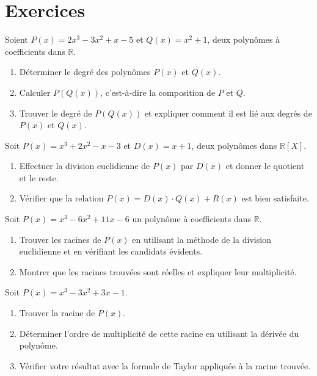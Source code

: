 \section{Exercices}
\begin{exercice}
Soient \( P(x) = 2x^3 - 3x^2 + x - 5 \) et \( Q(x) = x^2 + 1 \), deux polynômes à coefficients dans \( \mathbb{R} \).
\begin{enumerate}
    \item Déterminer le degré des polynômes \( P(x) \) et \( Q(x) \).
    \item Calculer \( P(Q(x)) \), c'est-à-dire la composition de \( P \) et \( Q \).
    \item Trouver le degré de \( P(Q(x)) \) et expliquer comment il est lié aux degrés de \( P(x) \) et \( Q(x) \).
\end{enumerate}
\end{exercice}

\begin{exercice}
Soit \( P(x) = x^3 + 2x^2 - x - 3 \) et \( D(x) = x + 1 \), deux polynômes dans \( \mathbb{R}[X] \).
\begin{enumerate}
    \item Effectuer la division euclidienne de \( P(x) \) par \( D(x) \) et donner le quotient et le reste.
    \item Vérifier que la relation \( P(x) = D(x) \cdot Q(x) + R(x) \) est bien satisfaite.
\end{enumerate}
\end{exercice}

\begin{exercice}
Soit \( P(x) = x^3 - 6x^2 + 11x - 6 \) un polynôme à coefficients dans \( \mathbb{R} \).
\begin{enumerate}
    \item Trouver les racines de \( P(x) \) en utilisant la méthode de la division euclidienne et en vérifiant les candidats évidents.
    \item Montrer que les racines trouvées sont réelles et expliquer leur multiplicité.
\end{enumerate}
\end{exercice}

\begin{exercice}
Soit \( P(x) = x^3 - 3x^2 + 3x - 1 \).
\begin{enumerate}
    \item Trouver la racine de \( P(x) \).
    \item Déterminer l’ordre de multiplicité de cette racine en utilisant la dérivée du polynôme.
    \item Vérifier votre résultat avec la formule de Taylor appliquée à la racine trouvée.
\end{enumerate}
\end{exercice}

